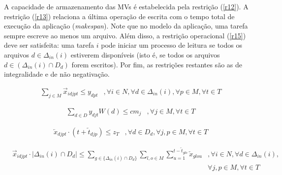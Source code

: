 A capacidade de armazenamento das MVs é estabelecida pela restrição (\ref{r12}). A restrição (\ref{r13}) relaciona a última operação de escrita com o tempo total de execução da aplicação (\textit{makespan}). Note que no modelo da aplicação, uma tarefa sempre escreve ao menos um arquivo. Além disso, a restrição operacional (\ref{r15}) deve ser satisfeita: uma tarefa $i$ pode iniciar um processo de leitura se todos os arquivos $d \in \Delta_{in}(i)$ estiverem disponíveis (isto é, se todos os arquivos $d \in (\Delta_{in}(i) \cap D_d)$ forem escritos). Por fim, as restrições restantes são as de integralidade e de não negativação.



\begin{align}
& \sum_{j \in M} \overrightarrow{x}_{idjpt} \leq y_{dpt} &, \forall i \in N, \forall d \in \Delta_{in}(i), \forall p \in M, \forall t \in T \label{r11}
\end{align}

\begin{align}
& \sum_{d \in D} y_{djt} W(d) \leq cm_j & , \forall j \in M, \forall t \in T \label{r12}
\end{align}

\begin{align}
& \overleftarrow{x}_{djpt}\cdot (t+\overleftarrow{t}_{djp}) \leq z_T & , \forall d \in D_d , \forall j,p \in M, \forall t \in T \label{r13}
\end{align}

\begin{align}
& \overrightarrow{x}_{idjpt} \cdot |\Delta_{in}(i) \cap D_d| \le \sum_{g \in \{\Delta_{in}(i) \cap D_d\}}\sum_{l,o \in M} \sum_{u=1}^{t-\overleftarrow{t}_{glo}}\overleftarrow{x}_{glou} & , \forall i \in N, \forall d \in \Delta_{in}(i), \nonumber \\
&&\forall j,p \in M, \forall t \in T \label{r15}
\end{align}







